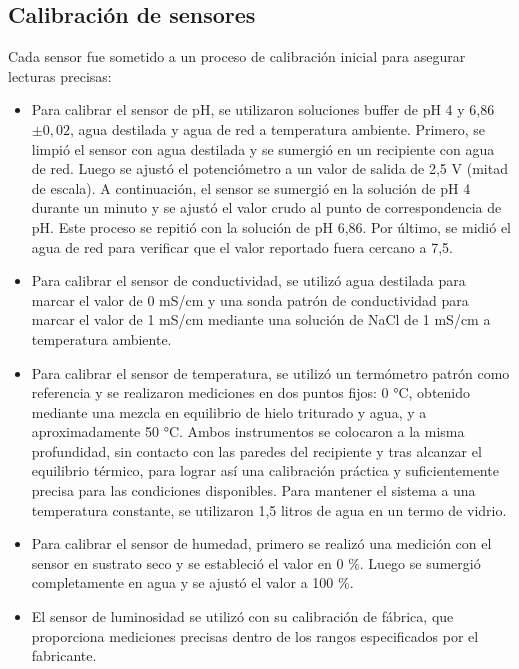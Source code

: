 \subsection{Calibración de sensores}
Cada sensor fue sometido a un proceso de calibración inicial para asegurar lecturas precisas:

\begin{itemize}
    \item Para calibrar el sensor de pH, se utilizaron soluciones buffer de pH 4 y 6,86 $\pm 0,02$, agua destilada y agua de red a temperatura ambiente. Primero, se limpió el sensor con agua destilada y se sumergió en un recipiente con agua de red. Luego se ajustó el potenciómetro a un valor de salida de 2,5 V (mitad de escala). A continuación, el sensor se sumergió en la solución de pH 4 durante un minuto y se ajustó el valor crudo al punto de correspondencia de pH. Este proceso se repitió con la solución de pH 6,86. Por último, se midió el agua de red para verificar que el valor reportado fuera cercano a 7,5.
    \item Para calibrar el sensor de conductividad, se utilizó agua destilada para marcar el valor de 0 mS/cm y una sonda patrón de conductividad para marcar el valor de 1 mS/cm mediante una solución de NaCl de 1 mS/cm a temperatura ambiente.
    \item Para calibrar el sensor de temperatura, se utilizó un termómetro patrón como referencia y se realizaron mediciones en dos puntos fijos: 0 °C, obtenido mediante una mezcla en equilibrio de hielo triturado y agua, y a aproximadamente 50 °C. Ambos instrumentos se colocaron a la misma profundidad, sin contacto con las paredes del recipiente y tras alcanzar el equilibrio térmico, para lograr así una calibración práctica y suficientemente precisa para las condiciones disponibles. Para mantener el sistema a una temperatura constante, se utilizaron 1,5 litros de agua en un termo de vidrio.
    \item Para calibrar el sensor de humedad, primero se realizó una medición con el sensor en sustrato seco y se estableció el valor en 0 \%. Luego se sumergió completamente en agua y se ajustó el valor a 100 \%.
    \item El sensor de luminosidad se utilizó con su calibración de fábrica, que proporciona mediciones precisas dentro de los rangos especificados por el fabricante.
\end{itemize}


